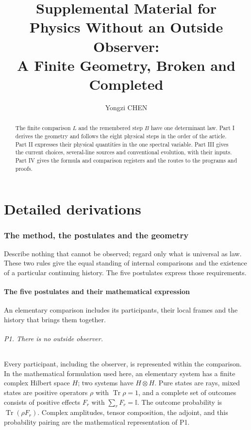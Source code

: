 \documentclass[aps,prx,onecolumn,10pt,notitlepage,nofootinbib,longbibliography]{revtex4-2}
\numberwithin{equation}{section}
\numberwithin{table}{section}
\newcommand{\Id}{\mathbb I}
\newcommand{\Tr}{\operatorname{Tr}}
\begin{document}
\title{Supplemental Material for\\
Physics Without an Outside Observer:\\
A Finite Geometry, Broken and Completed}
\author{Yongzi CHEN}
\date[]{}
\begin{abstract}
The finite comparison $L$ and the remembered step $B$ have one determinant law. Part I derives the geometry and follows the eight physical steps in the order of the article. Part II expresses their physical quantities in the one spectral variable. Part III gives the current choices, several-line sources and conventional evolution, with their inputs. Part IV gives the formula and comparison registers and the routes to the programs and proofs.
\end{abstract}
\maketitle
\raggedbottom
\begingroup\small\tableofcontents\endgroup
\clearpage
\part{Detailed derivations}\label{part:derivations}

\section{The method, the postulates and the geometry}
\label{sec:geometry}
Describe nothing that cannot be observed; regard only what is universal as law. These two rules give the equal standing of internal comparisons and the existence of a particular continuing history. The five postulates express those requirements.

\subsection{The five postulates and their mathematical expression}
An elementary comparison includes its participants, their local frames and the history that brings them together.

\paragraph*{P1. There is no outside observer.}
Every participant, including the observer, is represented within the comparison. In the mathematical formulation used here, an elementary system has a finite complex Hilbert space $H$; two systems have $H\otimes H$. Pure states are rays, mixed states are positive operators $\rho$ with $\Tr\rho=1$, and a complete set of outcomes consists of positive effects $F_r$ with $\sum_rF_r=\Id$. The outcome probability is $\Tr(\rho F_r)$. Complex amplitudes, tensor composition, the adjoint, and this probability pairing are the mathematical representation of P1.
\end{document}
